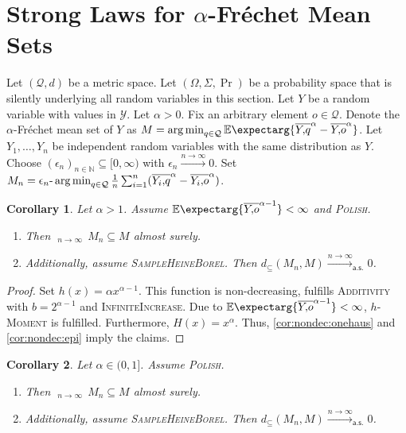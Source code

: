 \documentclass{scrartcl}
\renewcommand{\subset}{\subseteq}
\newcommand{\Ex}{\E\expectarg}
\newcommand*{\mc}[1]{\mathcal{#1}}
\newcommand*{\ms}[1]{\mathsf{#1}}
\newcommand{\N}{\mathbb{N}}
\DeclareMathOperator*{\argmin}{arg\,min}
\DeclareMathOperator*{\outerlim}{lim\, \overline{sup}}
\theoremstyle{plain}\newtheorem{theorem}{Theorem}[section]
\newtheorem{corollary}[theorem]{Corollary}
\theoremstyle{definition}
\theoremstyle{remark}
\providecommand{\DIFaddtex}[1]{{\protect\color{blue}\uwave{#1}}} %
\providecommand{\DIFdeltex}[1]{{\protect\color{red}\sout{#1}}}                      %
\providecommand{\DIFaddbegin}{} %
\providecommand{\DIFaddend}{} %
\providecommand{\DIFdelbegin}{} %
\providecommand{\DIFdelend}{} %
\providecommand{\DIFadd}[1]{\texorpdfstring{\DIFaddtex{#1}}{#1}} %
\providecommand{\DIFdel}[1]{\texorpdfstring{\DIFdeltex{#1}}{}} %
\newcommand{\DIFscaledelfig}{0.5}
\newlength{\DIFdelgraphicswidth} %
\newlength{\DIFdelgraphicsheight} %
\newcommand{\DIFaddincludegraphics}[2][]{{\color{blue}\fbox{\DIFOincludegraphics[#1]{#2}}}} %
\newcommand{\DIFdelincludegraphics}[2][]{%
\sbox{\DIFdelgraphicsbox}{\DIFOincludegraphics[#1]{#2}}%
\settoboxwidth{\DIFdelgraphicswidth}{\DIFdelgraphicsbox} %
\settoboxtotalheight{\DIFdelgraphicsheight}{\DIFdelgraphicsbox} %
\scalebox{\DIFscaledelfig}{%
\parbox[b]{\DIFdelgraphicswidth}{\usebox{\DIFdelgraphicsbox}\\[-\baselineskip] \rule{\DIFdelgraphicswidth}{0em}}\llap{\resizebox{\DIFdelgraphicswidth}{\DIFdelgraphicsheight}{%
\setlength{\unitlength}{\DIFdelgraphicswidth}%
\begin{picture}(1,1)%
\thicklines\linethickness{2pt} %
{\color[rgb]{1,0,0}\put(0,0){\framebox(1,1){}}}%
{\color[rgb]{1,0,0}\put(0,0){\line( 1,1){1}}}%
{\color[rgb]{1,0,0}\put(0,1){\line(1,-1){1}}}%
\end{picture}%
}\hspace*{3pt}}} %
} %
\DeclareRobustCommand{\DIFaddbegin}{\DIFOaddbegin \let\includegraphics\DIFaddincludegraphics} %
\DeclareRobustCommand{\DIFaddend}{\DIFOaddend \let\includegraphics\DIFOincludegraphics} %
\DeclareRobustCommand{\DIFdelbegin}{\DIFOdelbegin \let\includegraphics\DIFdelincludegraphics} %
\DeclareRobustCommand{\DIFdelend}{\DIFOaddend \let\includegraphics\DIFOincludegraphics} %
\begin{document}
 \section{Strong Laws for $\alpha$-Fréchet Mean Sets}\label{sec:power}
Let $(\mc Q, d)$ be a metric space. Let $(\Omega, \Sigma, \Pr)$ be a probability space that is silently underlying all random variables in this section. Let $Y$ be a random variable with values in \DIFdelbegin \DIFdel{$\mc Y$}\DIFdelend \DIFaddbegin \DIFadd{$\mc Q$}\DIFaddend .
Let $\alpha > 0$. Fix an arbitrary element $o\in\mc Q$. Denote the $\alpha$-Fréchet mean set of $Y$ as $M = \argmin_{q\in\mc Q} \Ex{\ol Yq^\alpha - \ol Yo^\alpha}$.
Let $Y_1, \dots, Y_n$ be independent random variables with the same distribution as $Y$.
Choose $(\epsilon_n)_{n\in\N}\subset [0,\infty)$ with $\epsilon_n \xrightarrow{n\to\infty}0$. Set $M_n =\epsilon_n\text{-}\argmin_{q\in\mc Q} \frac{1}n \sum_{i=1}^n (\ol {Y_i}q^\alpha - \ol{Y_i}o^\alpha)$.
\begin{corollary}\label{cor:cons_da}
	Let $\alpha > 1$.
	Assume $\Ex{\ol Yo^{\alpha-1}} < \infty$ and \textsc{Polish}.	
	\begin{enumerate}[label=(\roman*)]
	\item Then $\outerlim_{n\to\infty}\, M_n \subset M$ almost surely.
	\item Additionally, assume \textsc{SampleHeineBorel}.
		Then $d_\subset(M_n, M) \xrightarrow{n\to\infty}_{\ms{a.s.}} 0$.
	\end{enumerate}	
\end{corollary}
\begin{proof}
	Set $h(x) = \alpha x^{\alpha-1}$. This function is non-decreasing, fulfills \textsc{Additivity} with $b = 2^{\alpha-1}$ and \textsc{InfiniteIncrease}.
	Due to $\Ex{\ol Yo^{\alpha-1}} < \infty$, \textsc{$h$-Moment} is fulfilled. Furthermore, $H(x) = x^\alpha$. Thus, \autoref{cor:nondec:onehaus} and \autoref{cor:nondec:epi} imply the claims.
\end{proof}
\begin{corollary}\label{cor:median}
	Let $\alpha \in (0,1]$. Assume \textsc{Polish}.
	\begin{enumerate}[label=(\roman*)]
	\item Then $\outerlim_{n\to\infty}\, M_n \subset M$ almost surely.
	\item Additionally, assume \textsc{SampleHeineBorel}.
		Then $d_\subset(M_n, M) \xrightarrow{n\to\infty}_{\ms{a.s.}} 0$.
	\end{enumerate}	
\end{corollary}
\end{document}
